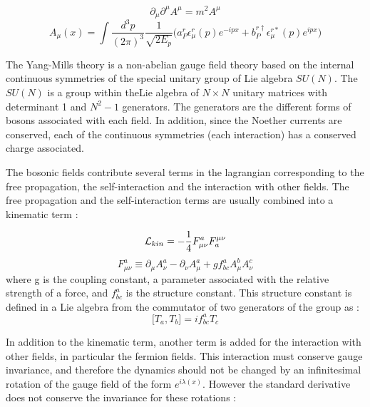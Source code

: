 \begin{equation}
    \partial_{\mu}\partial^{\mu}A^{\mu} = m^2 A^{\mu}
    \label{eq:proca}
\end{equation}
\begin{equation}
    A_{\mu}(x) = \int \frac{d^3 p}{(2\pi)^3} \frac{1}{\sqrt{2E_p}} \big( a_{P}^{r} \epsilon_{\mu}^{r}(p) e^{-ipx} + b_{P}^{r\dagger} \epsilon_{\mu}^{r*}(p) e^{ipx} \big)
\end{equation}

The Yang-Mills theory \cite{PhysRev.96.191} is a non-abelian gauge field theory based on the internal continuous symmetries of the special unitary group of Lie algebra $SU(N)$. The $SU(N)$ is a group within theLie algebra of $N \times N$ unitary matrices with determinant 1 and $N^2 -1$ generators. The generators are the different forms of bosons associated with each field. In addition, since the Noether currents are conserved, each of the continuous symmetries (each interaction) has a conserved charge associated.

The bosonic fields contribute several terms in the lagrangian corresponding to the free propagation, the self-interaction and the interaction with other fields. The free propagation and the self-interaction terms are usually combined into a kinematic term :

\begin{equation}
    \mathcal{L}_{kin} = -\frac{1}{4}F^{a}_{\mu\nu}F_{a}^{\mu\nu}
\end{equation}
\begin{equation}
    F^{a}_{\mu\nu} \equiv \partial_{\mu}A_{\nu}^a - \partial_{\nu}A_{\mu}^a + g f_{bc}^a A_{\mu}^b A_{\nu}^c
\end{equation}
where g is the coupling constant, a parameter associated with the relative strength of a force, and $f_{bc}^a$ is the structure constant. This structure constant is defined in a Lie algebra from the commutator of two generators of the group as :
\begin{equation}
    \big[ T_a , T_b \big] = i f_{bc}^a T_c
    \label{eq:commut}
\end{equation}


In addition to the kinematic term, another term is added for the interaction with other fields, in particular the fermion fields. This interaction must conserve gauge invariance, and therefore the dynamics should not be changed by an infinitesimal rotation of the gauge field of the form $e^{i\lambda(x)}$. However the standard derivative does not conserve the invariance for these rotations :

